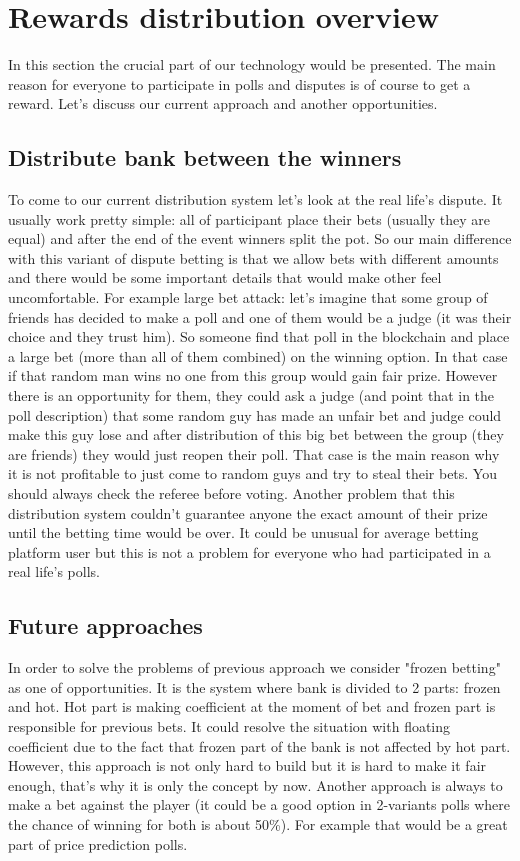 \documentclass [12pt] {article}
\begin{document}
	\section{Rewards distribution overview}
	In this section the crucial part of our technology would be presented. The main reason for everyone to participate in polls and disputes is of course to get a reward. Let's discuss our current approach and another opportunities.
	\subsection{Distribute bank between the winners}
	To come to our current distribution system let's look at the real life's dispute. It usually work pretty simple: all of participant place their bets (usually they are equal) and after the end of the event winners split the pot. So our main difference with this variant of dispute betting is that we allow bets with different amounts and there would be some important details that would make other feel uncomfortable. For example large bet attack: let's imagine that some group of friends has decided to make a poll and one of them would be a judge (it was their choice and they trust him). So someone find that poll in the blockchain and place a large bet (more than all of them combined) on the winning option. In that case if that random man wins no one from this group would gain fair prize. However there is an opportunity for them, they could ask a judge (and point that in the poll description) that some random guy has made an unfair bet and judge could make this guy lose and after distribution of this big bet between the group (they are friends) they would just reopen their poll. That case is the main reason why it is not profitable to just come to random guys and try to steal their bets. You should always check the referee before voting. Another problem that this distribution system couldn't guarantee anyone the exact amount of their prize until the betting time would be over. It could be unusual for average betting platform user but this is not a problem for everyone who had participated in a real life's polls.
	\subsection{Future approaches}
	In order to solve the problems of previous approach we consider "frozen betting" as one of opportunities. It is the system where bank is divided to 2 parts: frozen and hot. Hot part is making coefficient at the moment of bet and frozen part is responsible for previous bets. It could resolve the situation with floating coefficient due to the fact that frozen part of the bank is not affected by hot part. However, this approach is not only hard to build but it is hard to make it fair enough, that's why it is only the concept by now. Another approach is always to make a bet against the player (it could be a good option in 2-variants polls where the chance of winning for both is about 50\%). For example that would be a great part of price prediction polls.
\end{document}
